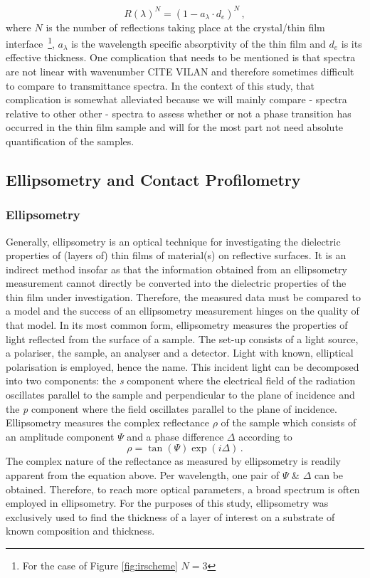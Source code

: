 \begin{equation}
\label{atr-reflectance}
	R(\lambda)^N = (1-a_{\lambda} \cdot d_e)^N \, ,
\end{equation}
where $N$ is the number of reflections taking place at the crystal/thin film interface~\footnote{For the case of Figure \ref{fig:irscheme} $N=3$}, $a_{\lambda}$ is the wavelength specific absorptivity of the thin film and $d_e$ is its effective thickness. One complication that needs to be mentioned is that \atr{} spectra are not linear with wavenumber CITE VILAN and therefore sometimes difficult to compare to transmittance spectra. In the context of this study, that complication is somewhat alleviated because we will mainly compare \atr{}-\ftir{} spectra relative to other other \atr{}-\ftir{} spectra to assess whether or not a phase transition has occurred in the thin film sample and will for the most part not need absolute quantification of the samples.
\subsection{Ellipsometry and Contact Profilometry}
\subsubsection{Ellipsometry}
Generally, ellipsometry is an optical technique for investigating the dielectric properties of (layers of) thin films of material(s) on reflective surfaces. It is an indirect method insofar as that the information obtained from an ellipsometry measurement cannot directly be converted into the dielectric properties of the thin film under investigation. Therefore, the measured data must be compared to a model and the success of an ellipsometry measurement hinges on the quality of that model. In its most common form, ellipsometry measures the properties of light reflected from the surface of a sample. The set-up consists of a light source, a polariser, the sample, an analyser and a detector. Light with known, elliptical polarisation is employed, hence the name. This incident light can be decomposed into two components: the \emph{s} component where the electrical field of the radiation oscillates parallel to the sample and perpendicular to the plane of incidence and the \emph{p} component where the field oscillates parallel to the plane of incidence. Ellipsometry measures the complex reflectance $\rho$ of the sample which consists of an amplitude component $\Psi$ and a phase difference $\Delta$ according to
\begin{equation}
	\rho = \tan \left( \Psi \right) \exp \left( i \Delta \right) \, .
\end{equation}
The complex nature of the reflectance as measured by ellipsometry is readily apparent from the equation above. Per wavelength, one pair of $\Psi$ \& $\Delta$ can be obtained. Therefore, to reach more optical parameters, a broad spectrum is often employed in ellipsometry. For the purposes of this study, ellipsometry was exclusively used to find the thickness of a layer of interest on a substrate of known composition and thickness.
